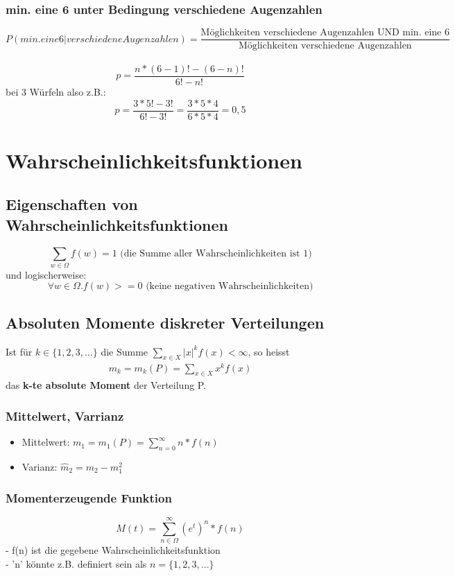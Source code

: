 \documentclass{article}
\begin{document}
\subsubsection{min. eine 6 unter Bedingung verschiedene Augenzahlen}
\[
	P(min. eine 6|verschiedene Augenzahlen) = \frac{\text{M\"oglichkeiten verschiedene Augenzahlen
	UND min. eine 6}}{\text{M\"oglichkeiten verschiedene Augenzahlen}}
\]\\
\[
	p=\frac{n*(6-1)!-(6-n)!}{6!-n!} 
\]
bei 3 W\"urfeln also z.B.:\[
	p=\frac{3*5!-3!}{6!-3!} = \frac{3*5*4}{6*5*4} = 0,5
\]

\section{Wahrscheinlichkeitsfunktionen}
\subsection{Eigenschaften von Wahrscheinlichkeitsfunktionen}
\[ \sum_{w \in \Omega} f(w) = 1 \text{ (die Summe aller Wahrscheinlichkeiten ist 1)}\]
und logischerweise:
\[ \forall w\in\Omega . f(w)>=0 \text{ (keine negativen Wahrscheinlichkeiten)} \]
\subsection{Absoluten Momente diskreter Verteilungen}
Ist f\"ur $k \in \{1,2,3,\ldots\}$ die Summe $\sum_{x \in X} |x|^kf(x) < \infty$,
so heisst
\begin{align}
	m_k = m_k(P) = \sum_{x \in X} x^kf(x)
\end{align}
das \textbf{k-te absolute Moment} der Verteilung P.

\subsubsection{Mittelwert, Varrianz}
\begin{itemize}
	\item Mittelwert: $m_1 = m_1(P) = \sum_{n=0}^\infty n*f(n)$
	\item Varianz: $\widehat{m}_2 = m_2 - m_1^2$
\end{itemize}
\subsubsection{Momenterzeugende Funktion}
\[
	M(t)=\sum_{n\in\Omega}^{\infty}(e^t)^n * f(n)
\]
- f(n) ist die gegebene Wahrscheinlichkeitsfunktion\\
- 'n' k\"onnte z.B. definiert sein als $n=\{1,2,3,...\}$
\end{document}
